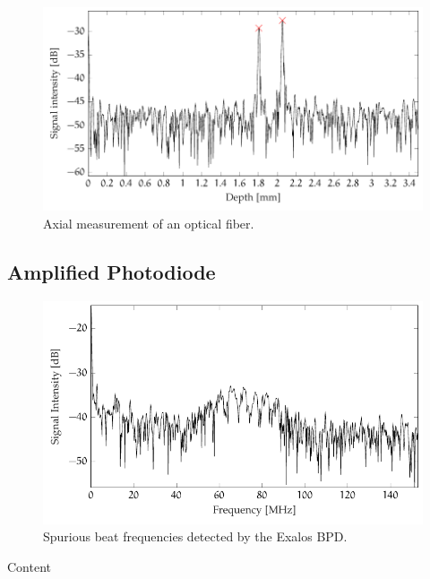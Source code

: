 \begin{figure}[hbt]
\myfloatalign
\includegraphics[width=\linewidth]{gfx/tikz/thickness-measure/fiber-thickness}
\caption{Axial measurement of an optical fiber.}\label{fig:fiber-thickness}
\end{figure}%
\subsection{Amplified Photodiode}

\begin{figure}[hbt]
\myfloatalign
\includegraphics[width=\linewidth]{gfx/tikz/axsun/spurious-frequencies}
\caption{Spurious beat frequencies detected by the Exalos \ac{BPD}.}\label{fig:spurious-frequencies}
\end{figure}%


Content


